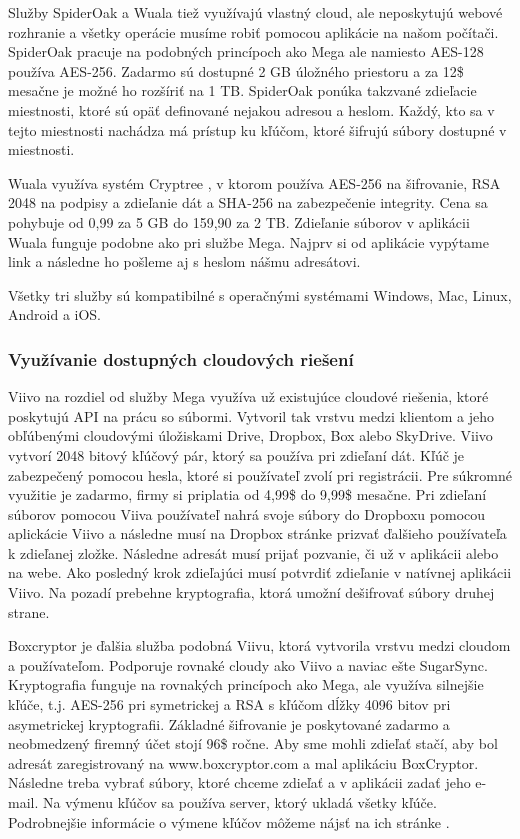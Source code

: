 		Služby SpiderOak \cite{spideroak} a Wuala \cite{wuala} tiež využívajú vlastný cloud, ale neposkytujú webové rozhranie a všetky operácie musíme robiť pomocou aplikácie na našom počítači. SpiderOak pracuje na podobných princípoch ako Mega ale namiesto AES-128 používa AES-256. Zadarmo sú dostupné 2 GB úložného priestoru a za 12\$ mesačne je možné ho rozšíriť na 1 TB. SpiderOak ponúka takzvané zdieľacie miestnosti, ktoré sú opäť definované nejakou adresou a heslom. Každý, kto sa v tejto miestnosti nachádza má prístup ku kľúčom, ktoré šifrujú súbory dostupné v miestnosti.
		
		 Wuala využíva systém Cryptree \cite{cryptree}, v ktorom používa AES-256 na šifrovanie, RSA 2048 na podpisy a zdieľanie dát a SHA-256 na zabezpečenie integrity. Cena sa pohybuje od 0,99 \EUR{} za 5 GB do 159,90 \EUR{} za 2 TB. Zdieľanie súborov v aplikácii Wuala funguje podobne ako pri službe Mega. Najprv si od aplikácie vypýtame link a následne ho pošleme aj s heslom nášmu adresátovi.
		 
		 Všetky tri služby sú kompatibilné s operačnými systémami Windows, Mac, Linux, Android a iOS.
		
	\subsubsection{Využívanie dostupných cloudových riešení}
		Viivo \cite{viivo} na rozdiel od služby Mega využíva už existujúce cloudové riešenia, ktoré poskytujú API na prácu so súbormi. Vytvoril tak vrstvu medzi klientom a jeho obľúbenými cloudovými úložiskami Drive, Dropbox, Box alebo SkyDrive. Viivo vytvorí 2048 bitový kľúčový pár, ktorý sa používa pri zdieľaní dát. Kľúč je zabezpečený pomocou hesla, ktoré si používateľ zvolí pri registrácii. Pre súkromné využitie je zadarmo, firmy si priplatia od 4,99\$ do 9,99\$ mesačne. Pri zdieľaní súborov pomocou Viiva používateľ nahrá svoje súbory do Dropboxu pomocou aplickácie Viivo a následne musí na Dropbox stránke prizvať ďalšieho používateľa k zdieľanej zložke. Následne adresát musí prijať pozvanie, či už v aplikácii alebo na webe. Ako posledný krok zdieľajúci musí potvrdiť zdieľanie v natívnej aplikácii Viivo. Na pozadí prebehne kryptografia, ktorá umožní dešifrovať súbory druhej strane.
		
		Boxcryptor \cite{boxcryptor} je ďalšia služba podobná Viivu, ktorá vytvorila vrstvu medzi cloudom a používateľom. Podporuje rovnaké cloudy ako Viivo a naviac ešte SugarSync. Kryptografia funguje na rovnakých princípoch ako Mega, ale využíva silnejšie kľúče, t.j. AES-256 pri symetrickej a RSA s kľúčom dĺžky 4096 bitov pri asymetrickej kryptografii. Základné šifrovanie je poskytované zadarmo a neobmedzený firemný účet stojí 96\$ ročne. Aby sme mohli zdieľať stačí, aby bol adresát zaregistrovaný na www.boxcryptor.com a mal aplikáciu BoxCryptor. Následne treba vybrať súbory, ktoré chceme zdieľať a v aplikácii zadať jeho e-mail. Na výmenu kľúčov sa používa server, ktorý ukladá všetky kľúče. Podrobnejšie informácie o výmene kľúčov môžeme nájsť na ich stránke \cite{boxcryptor}.
		
